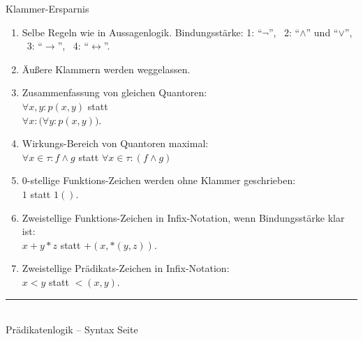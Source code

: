 \documentclass{slides}
\newcommand{\myrule}{\rule{20cm}{1mm}\\ }
\newcounter{mypage}
\begin{document}

\begin{slide}{}
\normalsize
\begin{center}
Klammer-Ersparnis
\end{center}
\vspace{0.5cm}

\footnotesize
\begin{enumerate}
\item Selbe Regeln wie in Aussagenlogik. Bindungsstärke: 
  1: ``$\neg$'', \ 2: ``$\wedge$'' und ``$\vee$'', \ 3: ``$\rightarrow$'', \ 4: ``$\leftrightarrow$''.
\item Äußere Klammern werden weggelassen.
\item Zusammenfassung von gleichen Quantoren: \\[0.3cm]
      \hspace*{1.3cm} $\forall x, y: p(x, y)$  
      statt \\[0.3cm]
      \hspace*{1.3cm} $\forall x: \Bigg( \forall y: p(x,y) \Bigg)$. 
\item Wirkungs-Bereich von Quantoren maximal: \\[0.3cm]
      \hspace*{1.3cm} $\forall x\in\tau: f \wedge g$ \quad statt \quad $\forall x\in\tau: (f \wedge g)$
\item 0-stellige Funktions-Zeichen werden ohne Klammer geschrieben: \\[0.3cm]
      \hspace*{1.3cm} $1$ \quad statt \quad $1()$.
\item Zweistellige Funktions-Zeichen in Infix-Notation,
      wenn Bindungsstärke klar ist: \\[0.3cm]
      \hspace*{1.3cm} $x + y * z$ \quad statt \quad $+(x, *(y,z))$.
\item Zweistellige Prädikats-Zeichen in Infix-Notation: \\[0.3cm]
      \hspace*{1.3cm} $x < y$ \quad statt \quad $<(x, y)$.
\end{enumerate}

\vspace*{\fill}
\tiny \addtocounter{mypage}{1}
\myrule
Prädikatenlogik -- Syntax  \hspace*{\fill} Seite 
\end{slide}
\end{document}
